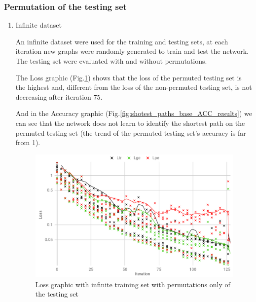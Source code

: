 \subsubsection {Permutation of the testing set}
    \begin{enumerate}[label=(\Alph*)]

        \item Infinite dataset
        \label{sec:infinite_test_only}
        
        An infinite dataset were used for the training and testing sets, at each iteration new graphs were randomly generated to train and test the network. The testing set were evaluated with and without permutations.
        
        The Loss graphic (Fig.\ref{fig:shotest_paths_base_results}) shows that the loss of the permuted testing set is the highest and, different from the loss of the non-permuted testing set, is not decreasing after iteration 75.
        
        And in the Accuracy graphic (Fig.\ref{fig:shotest_paths_base_ACC_results}) we can see that the network does not learn to identify the shortest path on the permuted testing set (the trend of the permuted testing set's accuracy is far from 1).
        
        \begin{figure}[H]
            \centering
            \includegraphics[width=.9\linewidth]{fig/content/results/shortest_path/base.png}
            \caption{Loss graphic with infinite training set with permutations only of the testing set}
            \label{fig:shotest_paths_base_results}
        \end{figure}
        

\end{enumerate}
